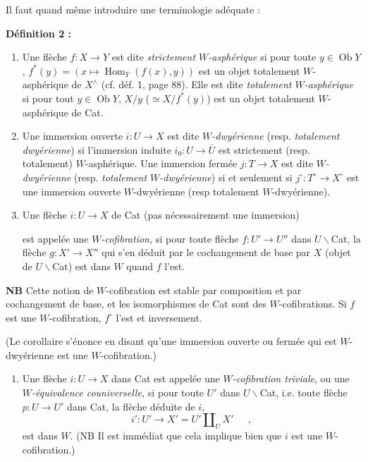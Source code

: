 \documentclass[11pt]{article}
\newcommand{\printedpage}[1]{\marginpar{\footnotesize p.~#1}}
\newcommand{\msp}[1]{\marginpar{\footnotesize [#1]}}
\begin{document}
Il faut quand même introduire une terminologie adéquate :

\textbf{Définition 2 :}

\begin{enumerate}[label=\alph*)]
\item Une flèche $f:X\longrightarrow Y$ est dite \textit{strictement $W$-asphérique} si pour toute $y\in\operatorname{Ob}Y$, $f^*(y)=(x\longmapsto\operatorname{Hom}_Y(f(x),y))$ est un objet totalement $W$-asphérique de $X^\wedge$ (cf. déf. 1, page 88). Elle est dite \textit{totalement $W$-asphérique} si pour tout $y\in\operatorname{Ob}Y$, $X/y$ ($\simeq X/f^*(y)$) est un objet totalement $W$-asphérique de Cat.

\item \printedpage{76}
Une immersion ouverte $i:U\longrightarrow X$ est dite \textit{$W$-dwyérienne} (resp. \textit{totalement} \textit{dwyérienne}) si l'immersion induite $i_0:U\longrightarrow\bar{U}$ est strictement (resp. totalement) $W$-asphérique. Une immersion fermée $j:T\longrightarrow X$ est dite \textit{$W$-dwyérienne} (resp. \textit{totalement $W$-dwyérienne}) si et seulement si $j^\circ:T^\circ\longrightarrow X^\circ$ est une immersion ouverte $W$-dwyérienne (resp totalement $W$-dwyérienne).

\item Une flèche $i:U\longrightarrow X$ de Cat (pas nécessairement une immersion)

\msp{page 110}

est appelée une \textit{$W$-cofibration,} si pour toute flèche $f:U'\longrightarrow U''$ dans $U\backslash$Cat, la flèche $g:X'\longrightarrow X''$ qui s'en déduit par le cochangement de base par $X$ (objet de $U\backslash$Cat) est dans $W$ quand $f$ l'est.
\end{enumerate}

\textbf{NB} Cette notion de $W$-cofibration est stable par composition et par cochangement de base, et les isomorphismes de Cat sont des $W$-cofibrations. Si $f$ est une $W$-cofibration, $f^\circ$ l'est et inversement.

(Le corollaire s'énonce en disant qu'une immersion ouverte ou fermée qui est $W$-dwyérienne est une $W$-cofibration.)

\begin{enumerate}[label=\alph*), start=4]
\item Une flèche $i:U\longrightarrow X$ dans Cat est appelée une \textit{$W$-cofibration triviale}, ou une \textit{$W$-équivalence couniverselle,} si pour toute $U'$ dans $U\backslash$Cat, i.e. toute flèche $p:U\longrightarrow U'$ dans Cat, la flèche déduite de $i$,
\[ i':U'\longrightarrow X'=U'\amalg_U X'\quad\ \ , \]
est dans $W$. (NB Il est immédiat que cela implique bien que $i$ est une $W$-cofibration.)
\end{enumerate}
\end{document}
